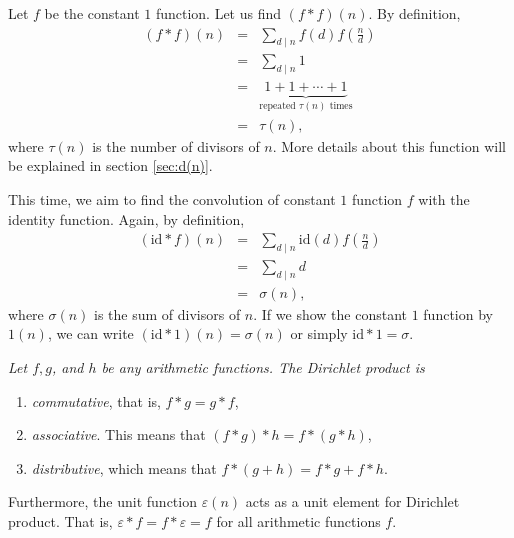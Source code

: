 \documentclass[12pt]{subfile}
\begin{document}
		\begin{example}
			Let $f$ be the constant $1$ function. Let us find $(f \ast f)(n)$. By definition,
				\begin{eqnarray*}
					(f \ast f)(n) & = & \sum_{d\mid n}f(d)f\left(\frac nd\right)\\
								  & = & \sum_{d\mid n} 1\\
								  & = & \underbrace{1 + 1 + \cdots + 1}_{\text{repeated } \tau(n) \text{ times}}\\
								  & = & \tau(n),
				\end{eqnarray*}
			where $\tau(n)$ is the number of divisors of $n$. More details about this function will be explained in section \ref{sec:d(n)}.
		\end{example}

		\begin{example}
			This time, we aim to find the convolution of constant $1$ function $f$ with the identity function. Again, by definition,
				\begin{eqnarray*}
					(\text{id} \ast f )(n) &=& \sum_{d\mid n}\text{id}(d)f\left(\frac nd\right)\\
									       &=& \sum_{d\mid n} d\\
										   &=& \sigma(n),
					\end{eqnarray*}
			where $\sigma(n)$ is the sum of divisors of $n$. If we show the constant $1$ function by $1(n)$, we can write $(\text{id} \ast 1)(n)=\sigma(n)$ or simply $\text{id} \ast 1 = \sigma$.
		\end{example}

		\begin{proposition}\slshape \label{prop:convolutionproperties}
			Let $f, g$, and $h$ be any arithmetic functions. The Dirichlet product is
			\begin{enumerate}
				\item \textit{commutative}, that is, $f\ast g = g \ast f$,
				\item \textit{associative}. This means that $(f \ast g) \ast h = f\ast (g\ast h)$,
				\item \textit{distributive}, which means that $f\ast (g+h) = f\ast g+ f\ast h$.
			\end{enumerate}
			Furthermore, the unit function $\varepsilon(n)$ acts as a unit element for Dirichlet product. That is, $\varepsilon\ast f = f \ast \varepsilon = f$ for all arithmetic functions $f$.
		\end{proposition}
\end{document}
